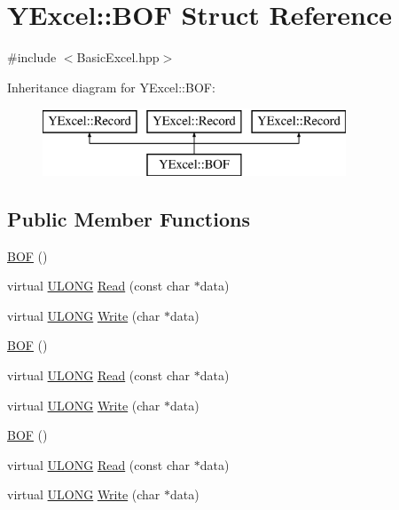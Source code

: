 \hypertarget{struct_y_excel_1_1_b_o_f}{}\section{Y\+Excel\+:\+:B\+O\+F Struct Reference}
\label{struct_y_excel_1_1_b_o_f}


{\ttfamily \#include $<$Basic\+Excel.\+hpp$>$}

Inheritance diagram for Y\+Excel\+:\+:B\+O\+F\+:\begin{figure}[H]
\begin{center}
\leavevmode
\includegraphics[height=2.000000cm]{struct_y_excel_1_1_b_o_f}
\end{center}
\end{figure}
\subsection*{Public Member Functions}
\begin{DoxyCompactItemize}
\item 
\hyperlink{struct_y_excel_1_1_b_o_f_a634e8d4a36db8c89ce16f921b968fbbe}{B\+O\+F} ()
\item 
virtual \hyperlink{_basic_excel_8hpp_abe09d1bea023be6a07cbadde8e955435}{U\+L\+O\+N\+G} \hyperlink{struct_y_excel_1_1_b_o_f_ab6d6b2e4d223485aa46889518489b053}{Read} (const char $\ast$data)
\item 
virtual \hyperlink{_basic_excel_8hpp_abe09d1bea023be6a07cbadde8e955435}{U\+L\+O\+N\+G} \hyperlink{struct_y_excel_1_1_b_o_f_ad0c51b5f3ae1b12ffd75681db1b0da10}{Write} (char $\ast$data)
\item 
\hyperlink{struct_y_excel_1_1_b_o_f_a634e8d4a36db8c89ce16f921b968fbbe}{B\+O\+F} ()
\item 
virtual \hyperlink{_basic_excel_8hpp_abe09d1bea023be6a07cbadde8e955435}{U\+L\+O\+N\+G} \hyperlink{struct_y_excel_1_1_b_o_f_a6daa633451a8af6c923ebe3be973a9bc}{Read} (const char $\ast$data)
\item 
virtual \hyperlink{_basic_excel_8hpp_abe09d1bea023be6a07cbadde8e955435}{U\+L\+O\+N\+G} \hyperlink{struct_y_excel_1_1_b_o_f_a6f1a6d5af5dafa1c9bae617d274d5be4}{Write} (char $\ast$data)
\item 
\hyperlink{struct_y_excel_1_1_b_o_f_a634e8d4a36db8c89ce16f921b968fbbe}{B\+O\+F} ()
\item 
virtual \hyperlink{_basic_excel_8hpp_abe09d1bea023be6a07cbadde8e955435}{U\+L\+O\+N\+G} \hyperlink{struct_y_excel_1_1_b_o_f_a6daa633451a8af6c923ebe3be973a9bc}{Read} (const char $\ast$data)
\item 
virtual \hyperlink{_basic_excel_8hpp_abe09d1bea023be6a07cbadde8e955435}{U\+L\+O\+N\+G} \hyperlink{struct_y_excel_1_1_b_o_f_a6f1a6d5af5dafa1c9bae617d274d5be4}{Write} (char $\ast$data)
\end{DoxyCompactItemize}
